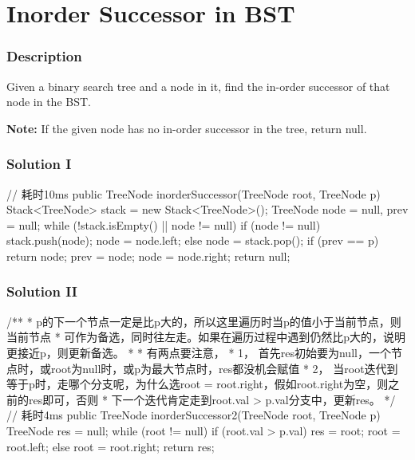 \newpage

\section{Inorder Successor in BST} %

\subsubsection{Description}
Given a binary search tree and a node in it, find the in-order successor of that node in the BST.

\textbf{Note:} If the given node has no in-order successor in the tree, return null.

\subsubsection{Solution I}

\begin{Code}
// 耗时10ms
public TreeNode inorderSuccessor(TreeNode root, TreeNode p) {
    Stack<TreeNode> stack = new Stack<TreeNode>();
    TreeNode node = null, prev = null;
    while (!stack.isEmpty() || node != null) {
        if (node != null) {
            stack.push(node);
            node = node.left;
        } else {
            node = stack.pop();
            if (prev == p) {
                return node;
            }
            prev = node;
            node = node.right;
        }
    }
    return null;
}
\end{Code}

\subsubsection{Solution II}
\begin{Code}
/**
 * p的下一个节点一定是比p大的，所以这里遍历时当p的值小于当前节点，则当前节点
 * 可作为备选，同时往左走。如果在遍历过程中遇到仍然比p大的，说明更接近p，则更新备选。
 *
 * 有两点要注意，
 * 1， 首先res初始要为null，一个节点时，或root为null时，或p为最大节点时，res都没机会赋值
 * 2， 当root迭代到等于p时，走哪个分支呢，为什么选root = root.right，假如root.right为空，则之前的res即可，否则
 * 下一个迭代肯定走到root.val > p.val分支中，更新res。
 */
// 耗时4ms
public TreeNode inorderSuccessor2(TreeNode root, TreeNode p) {
    TreeNode res = null;
    while (root != null) {
        if (root.val > p.val) {
            res = root;
            root = root.left;
        } else {
            root = root.right;
        }
    }
    return res;
}
\end{Code}

